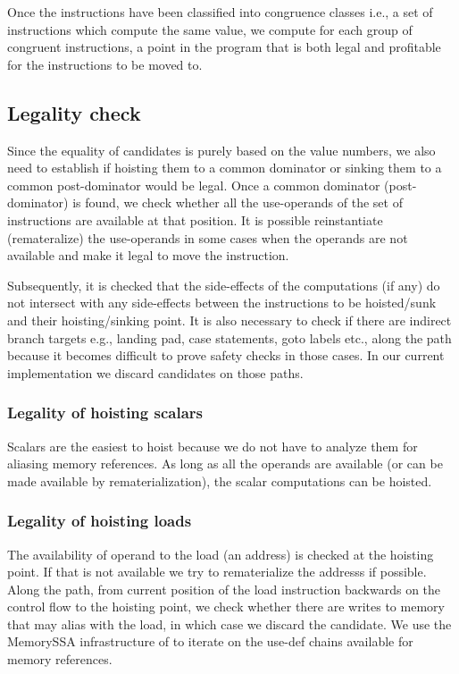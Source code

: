 \documentclass[acmlarge,review]{acmart}\settopmatter{printfolios=true}
\begin{document}
Once the instructions have been classified into congruence classes
\cite{briggs1997} i.e., a set of instructions which compute the same value, we
compute for each group of congruent instructions, a point in the program that is
both legal and profitable for the instructions to be moved to.

\subsection{Legality check}
\label{subsec:legality}
Since the equality of candidates is purely based on the value numbers, we also
need to establish if hoisting them to a common dominator or sinking them to a
common post-dominator would be legal. Once a common dominator (post-dominator)
is found, we check whether all the use-operands of the set of instructions are
available at that position. It is possible reinstantiate (remateralize) the
use-operands in some cases when the operands are not available and make it legal
to move the instruction.

Subsequently, it is checked that the side-effects of the computations (if any)
do not intersect with any side-effects between the instructions to be
hoisted/sunk and their hoisting/sinking point. It is also necessary to check if
there are indirect branch targets e.g., landing pad, case statements, goto
labels etc., along the path because it becomes difficult to prove safety checks
in those cases. In our current implementation we discard candidates on those
paths.

\subsubsection{Legality of hoisting scalars}
Scalars are the easiest to hoist because we do not have to analyze them for
aliasing memory references. As long as all the operands are available (or can be
made available by rematerialization), the scalar computations can be hoisted.

\subsubsection{Legality of hoisting loads}
The availability of operand to the load (an address) is checked at the hoisting
point. If that is not available we try to rematerialize the addresss if
possible.  Along the path, from current position of the load instruction
backwards on the control flow to the hoisting point, we check whether there are
writes to memory that may alias with the load, in which case we discard the
candidate. We use the MemorySSA infrastructure of \LLVM{} to iterate on the
use-def chains available for memory references.
\end{document}
